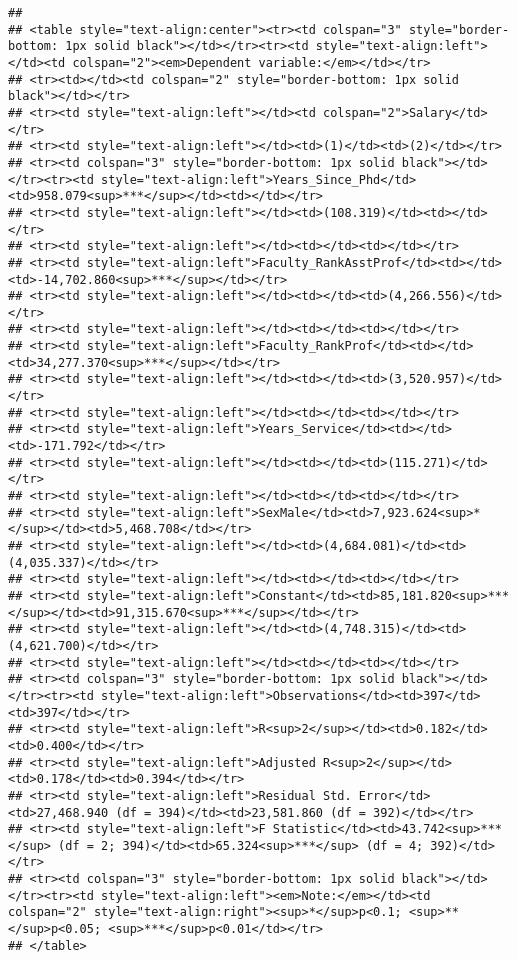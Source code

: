 \documentclass[]{article}
\begin{document}
\begin{verbatim}
## 
## <table style="text-align:center"><tr><td colspan="3" style="border-bottom: 1px solid black"></td></tr><tr><td style="text-align:left"></td><td colspan="2"><em>Dependent variable:</em></td></tr>
## <tr><td></td><td colspan="2" style="border-bottom: 1px solid black"></td></tr>
## <tr><td style="text-align:left"></td><td colspan="2">Salary</td></tr>
## <tr><td style="text-align:left"></td><td>(1)</td><td>(2)</td></tr>
## <tr><td colspan="3" style="border-bottom: 1px solid black"></td></tr><tr><td style="text-align:left">Years_Since_Phd</td><td>958.079<sup>***</sup></td><td></td></tr>
## <tr><td style="text-align:left"></td><td>(108.319)</td><td></td></tr>
## <tr><td style="text-align:left"></td><td></td><td></td></tr>
## <tr><td style="text-align:left">Faculty_RankAsstProf</td><td></td><td>-14,702.860<sup>***</sup></td></tr>
## <tr><td style="text-align:left"></td><td></td><td>(4,266.556)</td></tr>
## <tr><td style="text-align:left"></td><td></td><td></td></tr>
## <tr><td style="text-align:left">Faculty_RankProf</td><td></td><td>34,277.370<sup>***</sup></td></tr>
## <tr><td style="text-align:left"></td><td></td><td>(3,520.957)</td></tr>
## <tr><td style="text-align:left"></td><td></td><td></td></tr>
## <tr><td style="text-align:left">Years_Service</td><td></td><td>-171.792</td></tr>
## <tr><td style="text-align:left"></td><td></td><td>(115.271)</td></tr>
## <tr><td style="text-align:left"></td><td></td><td></td></tr>
## <tr><td style="text-align:left">SexMale</td><td>7,923.624<sup>*</sup></td><td>5,468.708</td></tr>
## <tr><td style="text-align:left"></td><td>(4,684.081)</td><td>(4,035.337)</td></tr>
## <tr><td style="text-align:left"></td><td></td><td></td></tr>
## <tr><td style="text-align:left">Constant</td><td>85,181.820<sup>***</sup></td><td>91,315.670<sup>***</sup></td></tr>
## <tr><td style="text-align:left"></td><td>(4,748.315)</td><td>(4,621.700)</td></tr>
## <tr><td style="text-align:left"></td><td></td><td></td></tr>
## <tr><td colspan="3" style="border-bottom: 1px solid black"></td></tr><tr><td style="text-align:left">Observations</td><td>397</td><td>397</td></tr>
## <tr><td style="text-align:left">R<sup>2</sup></td><td>0.182</td><td>0.400</td></tr>
## <tr><td style="text-align:left">Adjusted R<sup>2</sup></td><td>0.178</td><td>0.394</td></tr>
## <tr><td style="text-align:left">Residual Std. Error</td><td>27,468.940 (df = 394)</td><td>23,581.860 (df = 392)</td></tr>
## <tr><td style="text-align:left">F Statistic</td><td>43.742<sup>***</sup> (df = 2; 394)</td><td>65.324<sup>***</sup> (df = 4; 392)</td></tr>
## <tr><td colspan="3" style="border-bottom: 1px solid black"></td></tr><tr><td style="text-align:left"><em>Note:</em></td><td colspan="2" style="text-align:right"><sup>*</sup>p<0.1; <sup>**</sup>p<0.05; <sup>***</sup>p<0.01</td></tr>
## </table>
\end{verbatim}
\end{document}
